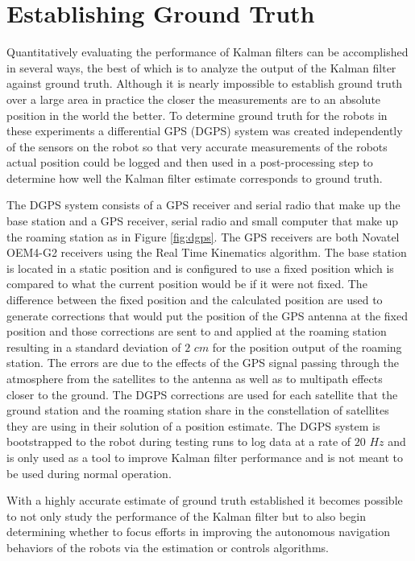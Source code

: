 \section{Establishing Ground Truth}
\label{sec:groundtruth}
Quantitatively evaluating the performance of Kalman filters can be accomplished in several ways, the best of which is to analyze the output of the Kalman filter against ground truth. Although it is nearly impossible to establish ground truth over a large area in practice the closer the measurements are to an absolute position in the world the better. To determine ground truth for the robots in these experiments a differential GPS (DGPS) system was created independently of the sensors on the robot so that very accurate measurements of the robots actual position could be logged and then used in a post-processing step to determine how well the Kalman filter estimate corresponds to ground truth.

The DGPS system consists of a GPS receiver and serial radio that make up the base station and a GPS receiver, serial radio and small computer that make up the roaming station as in Figure \ref{fig:dgps}. The GPS receivers are both Novatel OEM4-G2 receivers using the Real Time Kinematics algorithm. The base station is located in a static position and is configured to use a fixed position which is compared to what the current position would be if it were not fixed. The difference between the fixed position and the calculated position are used to generate corrections that would put the position of the GPS antenna at the fixed position and those corrections are sent to and applied at the roaming station resulting in a standard deviation of $2$ $cm$ for the position output of the roaming station. The errors are due to the effects of the GPS signal passing through the atmosphere from the satellites to the antenna as well as to multipath effects closer to the ground. The DGPS corrections are used for each satellite that the ground station and the roaming station share in the constellation of satellites they are using in their solution of a position estimate. The DGPS system is bootstrapped to the robot during testing runs to log data at a rate of $20$ $Hz$ and is only used as a tool to improve Kalman filter performance and is not meant to be used during normal operation.

With a highly accurate estimate of ground truth established it becomes possible to not only study the performance of the Kalman filter but to also begin determining whether to focus efforts in improving the autonomous navigation behaviors of the robots via the estimation or controls algorithms.

